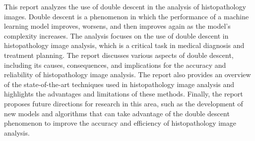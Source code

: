 This report analyzes the use of double descent in the analysis of histopathology images. Double descent is a phenomenon in which the performance of a machine learning model improves, worsens, and then improves again as the model's complexity increases. The analysis focuses on the use of double descent in histopathology image analysis, which is a critical task in medical diagnosis and treatment planning. The report discusses various aspects of double descent, including its causes, consequences, and implications for the accuracy and reliability of histopathology image analysis. The report also provides an overview of the state-of-the-art techniques used in histopathology image analysis and highlights the advantages and limitations of these methods. Finally, the report proposes future directions for research in this area, such as the development of new models and algorithms that can take advantage of the double descent phenomenon to improve the accuracy and efficiency of histopathology image analysis.